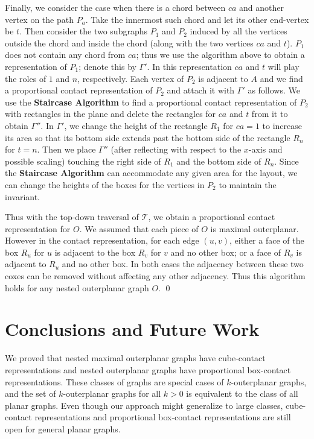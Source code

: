 \documentclass{llncs}
\begin{document}
	Finally, we consider the case when there is a chord between $ca$ and another vertex on the
	path $P_a$. Take the innermost such chord and let its other end-vertex be $t$. Then consider the two subgraphs $P_1$
	and $P_2$ induced by all the vertices outside the chord and inside the chord (along with
	the two vertices $ca$ and $t$). $P_1$ does not contain any chord from $ca$;
	thus we use the algorithm above to obtain a
	representation of $P_1$; denote this by $\Gamma'$. In this
	representation $ca$ and $t$ will play the roles of $1$ and $n$, respectively.
	Each vertex of $P_2$ is adjacent to $A$ and we find a proportional contact
	representation of $P_2$ and attach it with $\Gamma'$ as follows. We use the \textbf{Staircase
	Algorithm} to find a proportional contact representation of $P_2$ with rectangles in
	the plane and delete the rectangles for $ca$ and $t$ from it to obtain $\Gamma''$.
	In $\Gamma'$, we change the height of the rectangle $R_1$ for $ca=1$ to increase
	its area so that its bottom side extends past the bottom side of the rectangle $R_n$
	for $t=n$. Then we place $\Gamma''$ (after reflecting with respect to the $x$-axis
	and possible scaling) touching the right side of $R_1$ and the bottom side of $R_n$.
	Since the \textbf{Staircase Algorithm} can accommodate any given area for the layout,
	we can change the heights of the boxes for the vertices in $P_2$ to maintain the invariant.
	
	
	Thus with the top-down traversal of $\mathcal{T}$, we obtain a proportional contact
	representation for $O$. We assumed that each piece of $O$ is maximal outerplanar.
	However in the contact representation, for each edge $(u,v)$, either
	a face of the box $R_u$ for $u$ is adjacent to the box $R_v$ for $v$ and no other box;
	or a face of $R_v$ is adjacent to $R_u$ and no other box. In both cases the adjacency
	between these two coxes can be removed without affecting any other adjacency. Thus this
	algorithm holds for any nested outerplanar graph $O$. \qed













\section{Conclusions and Future Work}

 
We proved that nested maximal outerplanar graphs have cube-contact
 representations and nested outerplanar graphs have proportional box-contact representations.
 These classes of graphs are special cases of $k$-outerplanar graphs, and the set of
 $k$-outerplanar graphs for all $k>0$ is equivalent to the class of all planar graphs. 
Even though our approach might generalize to large classes, 
cube-contact representations and proportional box-contact representations are still open for general planar graphs.
\end{document}

